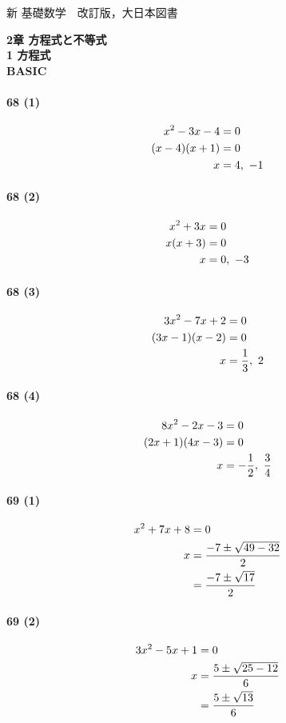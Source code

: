 \documentclass[fleqn,a4j,dvipdfmx,uplatex,twocolumn]{jsarticle}
\def\nr{\notag\\}%
\begin{document}
\begin{flushleft}
  新 基礎数学　改訂版，大日本図書
\end{flushleft}
\begin{center}
  \textbf{2章 方程式と不等式}\\
  \textbf{1 方程式}\\
  \textbf{BASIC}\\
\end{center}

\paragraph{68 (1)}
\begin{align*}
  x^2 - 3x - 4 &= 0 \nr
  (x - 4)(x + 1) &= 0 \nr
  x &= 4, \ -1
\end{align*}

\paragraph{68 (2)}
\begin{align*}
  x^2 + 3x &= 0 \nr
  x(x + 3) &= 0 \nr
  x &= 0, \ -3
\end{align*}

\paragraph{68 (3)}
\begin{align*}
  3x^2 - 7x + 2 &= 0 \nr
  (3x - 1)(x - 2) &= 0 \nr
  x &= \frac{1}{3}, \ 2
\end{align*}

\paragraph{68 (4)}
\begin{align*}
  8x^2 - 2x - 3 &= 0 \nr
  (2x + 1)(4x - 3) &= 0 \nr
  x &= -\frac{1}{2}, \ \frac{3}{4}
\end{align*}

\paragraph{69 (1)}
\begin{align*}
  x^2 + 7x + 8 &= 0 \nr
  x &= \frac{-7 \pm \sqrt{49 - 32}}{2} \nr
  &= \frac{-7 \pm \sqrt{17}}{2}
\end{align*}

\paragraph{69 (2)}
\begin{align*}
  3x^2 - 5x + 1 &= 0 \nr
  x &= \frac{5 \pm \sqrt{25 - 12}}{6} \nr
  &= \frac{5 \pm \sqrt{13}}{6}
\end{align*}
\end{document}
